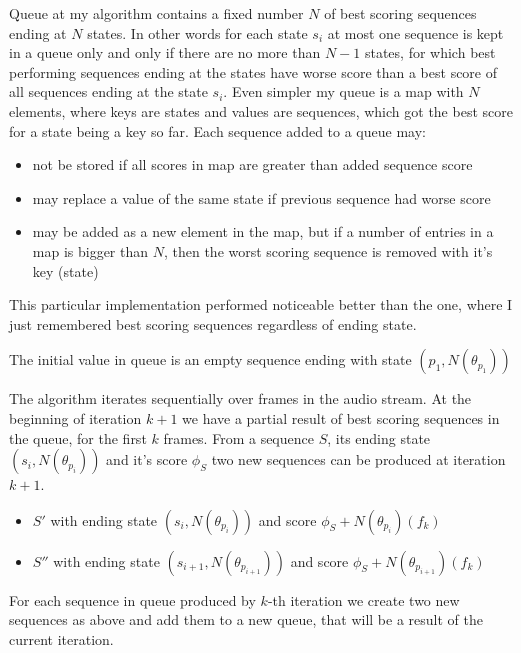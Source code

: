 \documentclass[12pt,a4paper,english]{article}
\begin{document}
Queue at my algorithm contains a fixed number $N$ of best scoring sequences ending at $N$ states. \newline
In other words for each state $s_i$ at most one sequence is kept in a queue only and only if there are no more than $N-1$ states, for which best performing sequences ending at the states have worse score than a best score of all sequences ending at the state $s_i$. \newline
Even simpler my queue is a map with $N$ elements, where keys are states and values are sequences, which got the best score for a state being a key so far. \newline
Each sequence added to a queue may:
\begin{itemize}
    \item not be stored if all scores in map are greater than added sequence score
    \item may replace a value of the same state if previous sequence had worse score
    \item may be added as a new element in the map, but if a number of entries in a map is bigger than $N$, then the worst scoring sequence is removed with it's key (state)
\end{itemize}
This particular implementation performed noticeable better than the one, where I just remembered best scoring sequences regardless of ending state. \newline

The initial value in queue is an empty sequence ending with state $(p_1, N(\theta_{p_1}))$

\newpage

The algorithm iterates sequentially over frames in the audio stream. \newline
At the beginning of iteration $k+1$ we have a partial result of best scoring sequences in the queue, for the first $k$ frames. \newline
From a sequence $S$, its ending state $(s_i, N(\theta_{p_i}))$ and it's score $\phi_S$ two new sequences can be produced at iteration $k+1$. 
\begin{itemize}
    \item $S'$ with ending state $(s_i, N(\theta_{p_i}))$ and score $\phi_S + N(\theta_{p_i})(f_k)$
    \item $S''$ with ending state $(s_{i+1}, N(\theta_{p_{i+1}}))$ and score $\phi_S+N(\theta_{p_{i+1}})(f_k)$
\end{itemize}
For each sequence in queue produced by $k$-th iteration we create two new sequences as above and add them to a new queue, that will be a result of the current iteration. \newline
\end{document}
